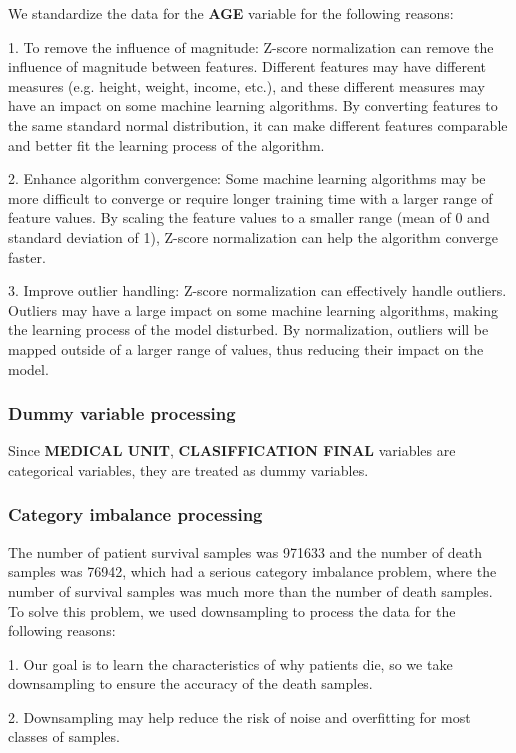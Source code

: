 \documentclass[
  journal=medium,
  manuscript=Report,
  year=2023,
  volume=37,
]{cup-journal}
\begin{document}
We standardize the data for the \textbf{AGE} variable for the following reasons:

1. To remove the influence of magnitude: Z-score normalization can remove the influence of magnitude between features. Different features may have different measures (e.g. height, weight, income, etc.), and these different measures may have an impact on some machine learning algorithms. By converting features to the same standard normal distribution, it can make different features comparable and better fit the learning process of the algorithm.

2. Enhance algorithm convergence: Some machine learning algorithms may be more difficult to converge or require longer training time with a larger range of feature values. By scaling the feature values to a smaller range (mean of 0 and standard deviation of 1), Z-score normalization can help the algorithm converge faster.

3. Improve outlier handling: Z-score normalization can effectively handle outliers. Outliers may have a large impact on some machine learning algorithms, making the learning process of the model disturbed. By normalization, outliers will be mapped outside of a larger range of values, thus reducing their impact on the model.

\subsubsection{Dummy variable processing}

Since \textbf{MEDICAL UNIT}, \textbf{CLASIFFICATION FINAL} variables are categorical variables, they are treated as dummy variables.

\subsubsection{Category imbalance processing}

The number of patient survival samples was 971633 and the number of death samples was 76942, which had a serious category imbalance problem, where the number of survival samples was much more than the number of death samples. To solve this problem, we used downsampling to process the data for the following reasons:

1. Our goal is to learn the characteristics of why patients die, so we take downsampling to ensure the accuracy of the death samples.

2. Downsampling may help reduce the risk of noise and overfitting for most classes of samples.
\end{document}
